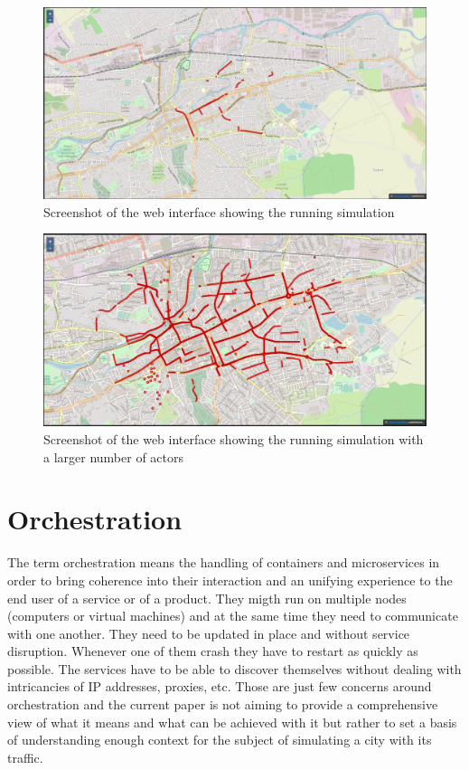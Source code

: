 \documentclass[conference]{IEEEtran}
\begin{document}
\begin{figure}
  \includegraphics[width=0.9\linewidth]{ScreenshotWebInterface.jpg}
  \centering
  \caption{Screenshot of the web interface showing the running simulation}
  \label{fig:ScreenshotWebInterface}
\end{figure}

\begin{figure}
  \includegraphics[width=0.9\linewidth]{ScreenshotWebInterface2.jpg}
  \centering
  \caption{Screenshot of the web interface showing the running simulation with a larger number of actors}
  \label{fig:ScreenshotWebInterface2}
\end{figure}

\section{Orchestration}
\label{sec:orchestration}

The term orchestration means the handling of containers and microservices in order to bring coherence into their interaction and an unifying experience to the end user of a service or of a product. They migth run on multiple nodes (computers or virtual machines) and at the same time they need to communicate with one another. They need to be updated in place and without service disruption. Whenever one of them crash they have to restart as quickly as possible. The services have to be able to discover themselves without dealing with intricancies of IP addresses, proxies, etc. Those are just few concerns around orchestration and the current paper is not aiming to provide a comprehensive view of what it means and what can be achieved with it but rather to set a basis of understanding enough context for the subject of simulating a city with its traffic.
\end{document}
